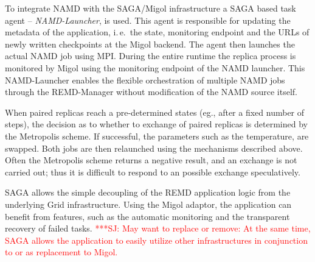 \documentclass[conference,final]{IEEEtran}
\newcommand{\jhanote}[1]{ {\textcolor{red} { ***SJ: #1 }}}
\newcommand{\jhanote}[1]{}
\begin{document}
To integrate NAMD with the SAGA/Migol infrastructure a SAGA based task
agent -- {\it NAMD-Launcher}, is used.  This agent is responsible for
updating the metadata of the application, i.\,e.\ the state,
monitoring endpoint and the URLs of newly written checkpoints at the
Migol backend.  The agent then launches the actual NAMD job using
MPI. During the entire runtime the replica process is monitored by
Migol using the monitoring endpoint of the NAMD launcher. This
NAMD-Launcher enables the flexible orchestration of multiple NAMD jobs
through the REMD-Manager without modification of the NAMD source
itself.


When paired replicas reach a pre-determined states (eg., after a fixed
number of steps), the decision as to whether to exchange of paired
replicas is determined by the Metropolis scheme. If successful, the
parameters such as the temperature, are swapped. Both jobs are then
relaunched using the mechanisms described above. Often the Metropolis
scheme returns a negative result, and an exchange is not carried out; thus
it is difficult to respond to an possible exchange speculatively.

SAGA allows the simple decoupling of the REMD application logic from
the underlying Grid infrastructure. Using the Migol adaptor, the
application can benefit from features, such as the automatic
monitoring and the transparent recovery of failed tasks.  \jhanote{May
  want to replace or remove: At the same time, SAGA allows the
  application to easily utilize other infrastructures in conjunction
  to or as replacement to Migol.}


                                             
\end{document}
